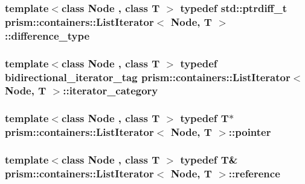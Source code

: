 \subsubsection[{\texorpdfstring{difference\+\_\+type}{difference_type}}]{\setlength{\rightskip}{0pt plus 5cm}template$<$class Node , class T $>$ typedef std\+::ptrdiff\+\_\+t {\bf prism\+::containers\+::\+List\+Iterator}$<$ Node, T $>$\+::{\bf difference\+\_\+type}}\hypertarget{structprism_1_1containers_1_1_list_iterator_a5d36bc90dfcc66e888054ac1fa8de786}{}\label{structprism_1_1containers_1_1_list_iterator_a5d36bc90dfcc66e888054ac1fa8de786}
\subsubsection[{\texorpdfstring{iterator\+\_\+category}{iterator_category}}]{\setlength{\rightskip}{0pt plus 5cm}template$<$class Node , class T $>$ typedef {\bf bidirectional\+\_\+iterator\+\_\+tag} {\bf prism\+::containers\+::\+List\+Iterator}$<$ Node, T $>$\+::{\bf iterator\+\_\+category}}\hypertarget{structprism_1_1containers_1_1_list_iterator_a83c92f7564a56d9597dfc6e10c79cc78}{}\label{structprism_1_1containers_1_1_list_iterator_a83c92f7564a56d9597dfc6e10c79cc78}
\subsubsection[{\texorpdfstring{pointer}{pointer}}]{\setlength{\rightskip}{0pt plus 5cm}template$<$class Node , class T $>$ typedef T$\ast$ {\bf prism\+::containers\+::\+List\+Iterator}$<$ Node, T $>$\+::{\bf pointer}}\hypertarget{structprism_1_1containers_1_1_list_iterator_a2e2390561608db7ef1938a21f32e7314}{}\label{structprism_1_1containers_1_1_list_iterator_a2e2390561608db7ef1938a21f32e7314}
\subsubsection[{\texorpdfstring{reference}{reference}}]{\setlength{\rightskip}{0pt plus 5cm}template$<$class Node , class T $>$ typedef T\& {\bf prism\+::containers\+::\+List\+Iterator}$<$ Node, T $>$\+::{\bf reference}}\hypertarget{structprism_1_1containers_1_1_list_iterator_a70680642555c1d031e3e99e66b89680d}{}\label{structprism_1_1containers_1_1_list_iterator_a70680642555c1d031e3e99e66b89680d}
